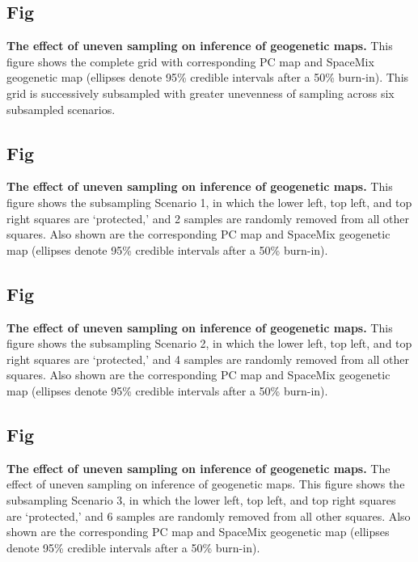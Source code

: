 \documentclass[10pt,letterpaper]{article}
\begin{document}
\subsection{Fig}
\label{sfig:uneven_sampling_total_grid}
{\bf{
	The effect of uneven sampling on inference of geogenetic maps.}}
	This figure shows the complete grid with corresponding PC map
	and SpaceMix geogenetic map 
	(ellipses denote 95\% credible intervals after a 50\% burn-in).  
	This grid is successively subsampled with greater unevenness of
	sampling across six subsampled scenarios.
	
\subsection{Fig}
\label{sfig:uneven_sampling_grid_subsamp1}
{\bf{
	The effect of uneven sampling on inference of geogenetic maps.}}
	This figure shows the subsampling Scenario 1, 
	in which the lower left, top left, and top right squares are `protected,'
	and 2 samples are randomly removed from all other squares.
	Also shown are the corresponding PC map and 
	SpaceMix geogenetic map 
	(ellipses denote 95\% credible intervals after a 50\% burn-in).

\subsection{Fig}			
\label{sfig:uneven_sampling_grid_subsamp2}
{\bf{
	The effect of uneven sampling on inference of geogenetic maps.}}
	This figure shows the subsampling Scenario 2, 
	in which the lower left, top left, and top right squares are `protected,'
	and 4 samples are randomly removed from all other squares.
	Also shown are the corresponding PC map and 
	SpaceMix geogenetic map 
	(ellipses denote 95\% credible intervals after a 50\% burn-in).

\subsection{Fig}			
\label{sfig:uneven_sampling_grid_subsamp3}
{\bf{
	The effect of uneven sampling on inference of geogenetic maps.}}
	The effect of uneven sampling on inference of geogenetic maps.  
	This figure shows the subsampling Scenario 3, 
	in which the lower left, top left, and top right squares are `protected,'
	and 6 samples are randomly removed from all other squares.
	Also shown are the corresponding PC map and 
	SpaceMix geogenetic map 
	(ellipses denote 95\% credible intervals after a 50\% burn-in).
\end{document}
